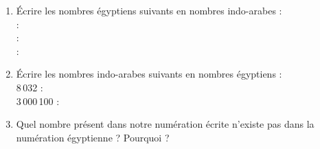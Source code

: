 \begin{enumerate}
      \item Écrire les nombres égyptiens suivants en nombres indo-arabes : \\ [2mm]
      {\Large\textpmhg{\HXthousand\Hthousand\Hthousand\Hten\Hten\Hten\Hten\Hten\Hten}} : \pf \\ [3mm]
      {\Large\textpmhg{\HCthousand\HXthousand\HXthousand\HXthousand\Hthousand\Hthousand\Hthousand\Hhundred\Hhundred\Hhundred\Hten\Hten\Hten\Hten\Hone\Hone\Hone\Hone\Hone\Hone\Hone\Hone}} : \pf \\  [3mm]
      {\Large\textpmhg{\Hmillion\Hmillion\Hmillion\HCthousand\Hone\Hone}} : \pf \\
      \item Écrire les nombres indo-arabes suivants en nombres égyptiens : \\ [4mm]
      8\,032 : \pf \\ [5mm]
      3\,000\,100 :  \pf \\
      \item Quel nombre présent dans notre numération écrite n'existe pas dans la numération égyptienne ? Pourquoi ? \\ [3mm]
      \pf
      \end{enumerate}

